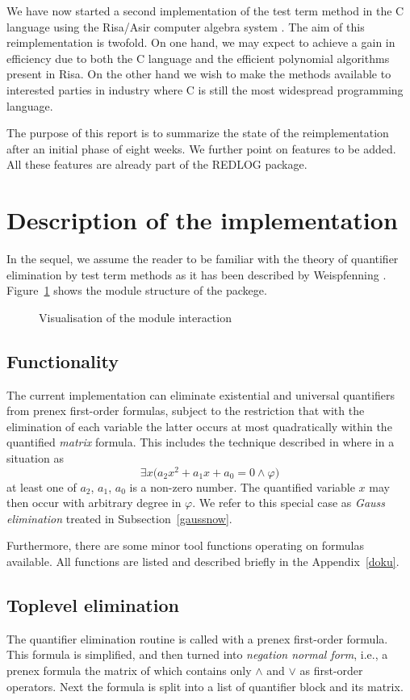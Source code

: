 We have now started a second implementation of the test term method in
the C language using the Risa/Asir computer algebra system
\cite{NoroTakeshima:92}. The aim of this reimplementation is twofold.
On one hand, we may expect to achieve a gain in efficiency due to both
the C language and the efficient polynomial algorithms present in
Risa. On the other hand we wish to make the methods available to
interested parties in industry where C is still the most widespread
programming language.

The purpose of this report is to summarize the state of the
reimplementation after an initial phase of eight weeks. We further
point on features to be added. All these features are already part of
the REDLOG package.
%
\section{Description of the implementation}
In the sequel, we assume the reader to be familiar with the theory of
quantifier elimination by test term methods as it has been described
by Weispfenning \cite{LoosWeispfenning:93,Weispfenning:96}.
Figure~\ref{modstruct} shows the module structure of the packege.
\begin{figure}
\centerline{}
\caption{Visualisation of the module interaction\label{modstruct}}
\end{figure}
\subsection{Functionality}
The current implementation can eliminate existential and universal
quantifiers from prenex first-order formulas, subject to the
restriction that with the elimination of each variable the latter
occurs at most quadratically within the quantified {\em matrix}
formula. This includes the technique described in
\cite{Weispfenning:96} where in a situation as
$$
\exists x\bigl(a_2x^2+a_1x+a_0=0\land\varphi\bigr)
$$
at least one of $a_2$, $a_1$, $a_0$ is a non-zero number. The
quantified variable $x$ may then occur with arbitrary degree in
$\varphi$. We refer to this special case as {\em Gauss elimination}
treated in Subsection~\ref{gaussnow}.

Furthermore, there are some minor tool functions operating on formulas
available. All functions are listed and described briefly in the
Appendix~\ref{doku}.

\subsection{Toplevel elimination}
The quantifier elimination routine is called with a prenex first-order
formula. This formula is simplified, and then turned into {\em
negation normal form}, i.e., a prenex formula the matrix of which
contains only $\land$ and $\lor$ as first-order operators. Next the
formula is split into a list of quantifier block and its matrix.

